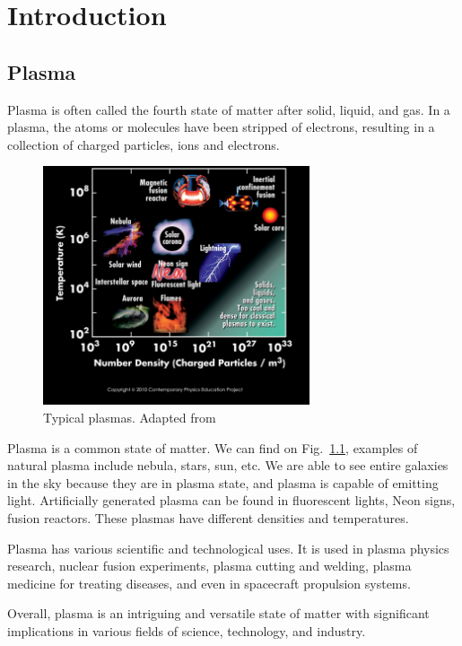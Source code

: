 \chapter{Introduction}
\section{Plasma}
Plasma is often called the fourth state of matter after solid, liquid, and gas. \cite{chen_introduction_2016} In a plasma, the atoms or molecules have been stripped of electrons, resulting in a collection of charged particles, ions and electrons.

\begin{figure}[htbp]
	\centering
	\includegraphics[width=0.7\textwidth]{figures/plasma-properties}
	\caption{Typical plasmas. Adapted from \cite{cpep_physics}}
	\label{fig:plasma-properties}
\end{figure}

Plasma is a common state of matter. We can find on Fig.~\ref{fig:plasma-properties}, examples of natural plasma include nebula, stars, sun, etc. We are able to see entire galaxies in the sky because they are in plasma state, and plasma is capable of emitting light. \cite{chen_introduction_2016} Artificially generated plasma can be found in fluorescent lights, Neon signs, fusion reactors. These plasmas have different densities and temperatures.

Plasma has various scientific and technological uses. It is used in plasma physics research, nuclear fusion experiments, plasma cutting and welding, plasma medicine for treating diseases, and even in spacecraft propulsion systems.

Overall, plasma is an intriguing and versatile state of matter with significant implications in various fields of science, technology, and industry.

